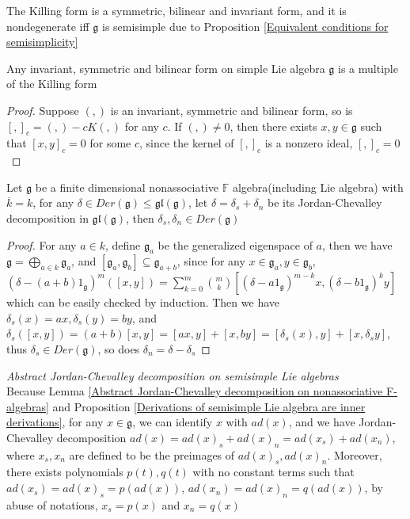 \documentclass[main]{subfiles}
\begin{document}
\begin{example}
The Killing form is a symmetric, bilinear and invariant form, and it is nondegenerate iff $\mathfrak{g}$ is semisimple due to Proposition \ref{Equivalent conditions for semisimplicity}
\end{example}

\begin{lemma}\label{nondegenerate, symmetric, bilinear and invariant form is unique up to scalar}
Any invariant, symmetric and bilinear form on simple Lie algebra $\mathfrak g$ is a multiple of the Killing form
\end{lemma}

\begin{proof}
Suppose $(,)$ is an invariant, symmetric and bilinear form, so is $[,]_c=(,)-cK(,)$ for any $c$. If $(,)\neq0$, then there exists $x,y\in\mathfrak g$ such that $[x,y]_c=0$ for some $c$, since the kernel of $[,]_c$ is a nonzero ideal, $[,]_c=0$
\end{proof}

\begin{lemma}\label{Abstract Jordan-Chevalley decomposition on nonassociative F-algebras}
Let $\mathfrak{g}$ be a finite dimensional nonassociative $\mathbb{F}$ algebra(including Lie algebra) with $\overline{k}=k$, for any $\delta\in Der(\mathfrak{g})\leq\mathfrak{gl}(\mathfrak{g})$, let $\delta=\delta_s+\delta_n$ be its Jordan-Chevalley decomposition in $\mathfrak{gl}(\mathfrak{g})$, then $\delta_s,\delta_n\in Der(\mathfrak{g})$
\end{lemma}

\begin{proof}
For any $a\in k$, define $\mathfrak{g}_a$ be the generalized eigenspace of $a$, then we have $\mathfrak{g}=\displaystyle\bigoplus_{a\in k}\mathfrak{g}_a$, and $[\mathfrak{g}_a,\mathfrak{g}_b]\subseteq\mathfrak{g}_{a+b}$, since for any $x\in\mathfrak{g}_a,y\in\mathfrak{g}_b$, $(\delta-(a+b)1_{\mathfrak{g}})^m([x,y])=\displaystyle\sum_{k=0}^m\binom{m}{k}\left[(\delta-a1_\mathfrak{g})^{m-k}x,(\delta-b1_\mathfrak{g})^{k}y\right]$ which can be easily checked by induction. Then we have $\delta_s(x)=ax,\delta_s(y)=by$, and $\delta_s([x,y])=(a+b)[x,y]=[ax,y]+[x,by]=[\delta_s(x),y]+[x,\delta_sy]$, thus $\delta_s\in Der(\mathfrak{g})$, so does $\delta_n=\delta-\delta_s$
\end{proof}

\begin{definition}\textit{Abstract Jordan-Chevalley decomposition on semisimple Lie algebras}\label{Abstract Jordan-Chevalley decomposition on semisimple Lie algebras} \\
Because Lemma \ref{Abstract Jordan-Chevalley decomposition on nonassociative F-algebras} and Proposition \ref{Derivations of semisimple Lie algebra are inner derivations}, for any $x\in\mathfrak{g}$, we can identify $x$ with $ad(x)$, and we have Jordan-Chevalley decomposition $ad(x)=ad(x)_s+ad(x)_n=ad(x_s)+ad(x_n)$, where $x_s,x_n$ are defined to be the preimages of $ad(x)_s,ad(x)_n$. Moreover, there exists polynomials $p(t),q(t)$ with no constant terms such that $ad(x_s)=ad(x)_s=p(ad(x))$, $ad(x_n)=ad(x)_n=q(ad(x))$, by abuse of notations, $x_s=p(x)$ and $x_n=q(x)$
\end{definition}
\end{document}
